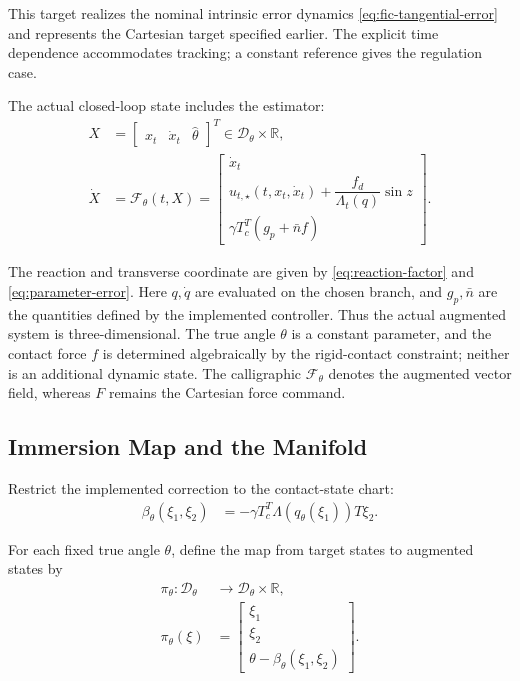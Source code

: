 \documentclass[10pt,journal,letterpaper]{IEEEtran}
\begin{document}
This target realizes the nominal intrinsic error dynamics \eqref{eq:fic-tangential-error} and represents the Cartesian target specified earlier. The explicit time dependence accommodates tracking; a constant reference gives the regulation case.

The actual closed-loop state includes the estimator:
\begin{align*}
X&=\begin{bmatrix}x_t&\dot x_t&\hat\theta\end{bmatrix}^T
\in\mathcal D_\theta\times\mathbb R,\\
\dot X&=\mathcal F_\theta(t,X)
=\begin{bmatrix}
\dot x_t\\
u_{t,\star}(t,x_t,\dot x_t)
+\dfrac{f_d}{\Lambda_t(q)}\sin z\\
\gamma T_c^T(g_p+\bar n f)
\end{bmatrix}.
\end{align*}

The reaction and transverse coordinate are given by \eqref{eq:reaction-factor} and \eqref{eq:parameter-error}. Here $q,\dot q$ are evaluated on the chosen branch, and $g_p,\bar n$ are the quantities defined by the implemented controller. Thus the actual augmented system is three-dimensional. The true angle $\theta$ is a constant parameter, and the contact force $f$ is determined algebraically by the rigid-contact constraint; neither is an additional dynamic state. The calligraphic $\mathcal F_\theta$ denotes the augmented vector field, whereas $F$ remains the Cartesian force command.

\subsection{Immersion Map and the Manifold}

Restrict the implemented correction to the contact-state chart:
\begin{align*}
\beta_\theta(\xi_1,\xi_2)
&=-\gamma T_c^T\Lambda(q_\theta(\xi_1))T\xi_2.
\end{align*}

For each fixed true angle $\theta$, define the map from target states to augmented states by
\begin{align*}
\pi_\theta:\mathcal D_\theta&\longrightarrow
\mathcal D_\theta\times\mathbb R,\\
\pi_\theta(\xi)&=\begin{bmatrix}
\xi_1\\\xi_2\\\theta-\beta_\theta(\xi_1,\xi_2)
\end{bmatrix}.
\end{align*}
\end{document}
